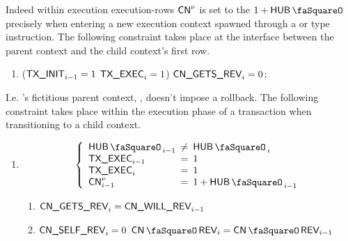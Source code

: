 
Indeed within execution execution-rows $\textsf{CN}^{\nu}$ is set to the $1 + \hubStamp$ precisely when entering a new execution context spawned through a  or  type instruction.
The following constraint takes place at the interface between the parent context and the child context's first row.
\begin{enumerate}
	\item \If \big($\textsf{TX}\textsf{\_INIT}_{i - 1} = 1$ \et  $\textsf{TX}\textsf{\_EXEC}_{i} = 1$\big) \Then $\textsf{CN}\textsf{\_GETS\_REV}_{i} = 0$;
\end{enumerate}
I.e. \locRootContext{}'s fictitious parent context, \locBedrockContext{}, doesn't impose a rollback.
The following constraint takes place within the execution phase of a transaction when transitioning to a child context.
\begin{enumerate}[resume]
	\item \If
		\[ 
		\left\{ \begin{array}{lcl}
			\hubStamp  _{i - 1} & \!\!\! \neq \!\!\! & \hubStamp_{i}         \\
			\txExec    _{i - 1} & \!\!\! =    \!\!\! & 1                     \\
			\txExec    _{i}     & \!\!\! =    \!\!\! & 1                     \\
			\cn\new    _{i - 1} & \!\!\! =    \!\!\! & 1 + \hubStamp_{i - 1} \\
		\end{array} \right.
		\]
		\Then
		\begin{enumerate}
			\item $\textsf{CN}\textsf{\_GETS\_REV}_{i} = \textsf{CN}\textsf{\_WILL\_REV}_{i - 1}$
			\item \If $\textsf{CN}\textsf{\_SELF\_REV}_{i} = 0$ \Then $\cnRevStamp_{i} = \cnRevStamp_{i - 1}$
		\end{enumerate}
\end{enumerate}
